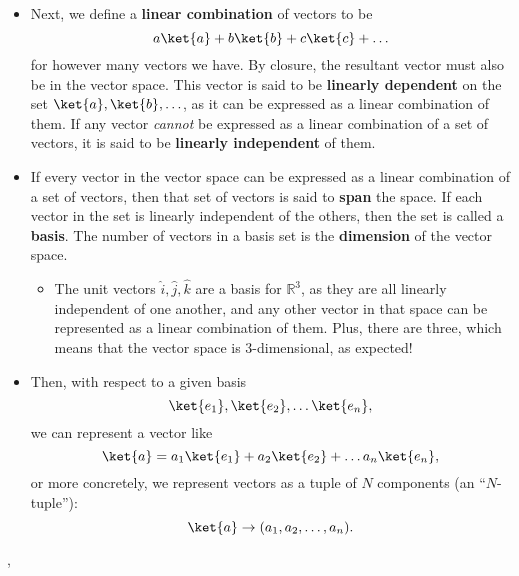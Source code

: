 \begin{itemize}
    \item Next, we define a \textbf{linear combination} of vectors to be 
        \begin{equation*}
            a\ket{a} + b\ket{b} + c\ket{c} + \ldots
        \end{equation*}
        for however many vectors we have. By closure, the resultant vector must also be in the vector space. This vector is said to be \textbf{linearly dependent} on the set $\ket{a},\ket{b},\ldots$, as it can be expressed as a linear combination of them. If any vector \textit{cannot} be expressed as a linear combination of a set of vectors, it is said to be \textbf{linearly independent} of them.
    \item If every vector in the vector space can be expressed as a linear combination of a set of vectors, then that set of vectors is said to \textbf{span} the space. If each vector in the set is linearly independent of the others, then the set is called a \textbf{basis}. The number of vectors in a basis set is the \textbf{dimension} of the vector space.
    \begin{itemize}
        \item The unit vectors $\hat{i},\hat{j},\hat{k}$ are a basis for $\mathbb{R}^3$, as they are all linearly independent of one another, and any other vector in that space can be represented as a linear combination of them. Plus, there are three, which means that the vector space is 3-dimensional, as expected!
    \end{itemize}
    \item Then, with respect to a given basis
        \begin{equation*}
            \ket{e_1},\ket{e_2}, \ldots \ket{e_n},
        \end{equation*}
        we can represent a vector like
        \begin{equation*}
            \ket{a} = a_1\ket{e_1} + a_2\ket{e_2} + \ldots a_n\ket{e_n},
        \end{equation*}
        or more concretely, we represent vectors as a tuple of $N$ components (an ``$N$-tuple''):
        \begin{equation*}
            \ket{a} \rightarrow (a_1,a_2,\ldots,a_n).
        \end{equation*}
\end{itemize}

\sep

